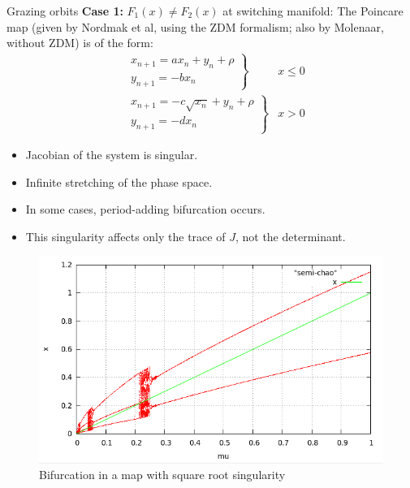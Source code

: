 \documentclass[xcolor=x11names,compress]{beamer}
\renewcommand{\(}{\begin{columns}}
\renewcommand{\)}{\end{columns}}
\newcommand{\<}[1]{\begin{column}{#1}}
\renewcommand{\>}{\end{column}}
\newcommand{\case}[1]{\textbf{Case #1:}}
\begin{document}
\begin{frame}{Grazing orbits}
\case{1} $F_1(x)\neq F_2(x)$ at switching manifold:
The Poincare map (given by Nordmak et al\cite{paper:nordmark-sqrt}, using the 
ZDM formalism; also by Molenaar, without ZDM) is of the form:
\begin{align*}
&\left.  \begin{array}{lr}
x_{n+1}=ax_n + y_n + \rho\\
y_{n+1}= -bx_n
\end{array}
\right\}  &x\leq 0\\
&\left.  \begin{array}{lr}
x_{n+1}= -c \sqrt{x_n} + y_n +\rho\\
y_{n+1}= -dx_n
\end{array}
\right\}  & x>0
\end{align*}

\begin{itemize}
\item Jacobian of the system is singular. \\
\item Infinite stretching of the phase space.  \\
\item In some cases, period-adding bifurcation occurs.  \\
\item This singularity affects only the trace of $J$, not the determinant. \cite{paper:sob-trace-sing} 
\end{itemize}

\end{frame}


\begin{frame}

\begin{figure}
\caption{Bifurcation in a map with square root singularity}
\begin{center}
\includegraphics[width=0.9\columnwidth]{../2011-08-14/semi-chao}
\end{center}
\end{figure}
\end{frame}
\end{document}
